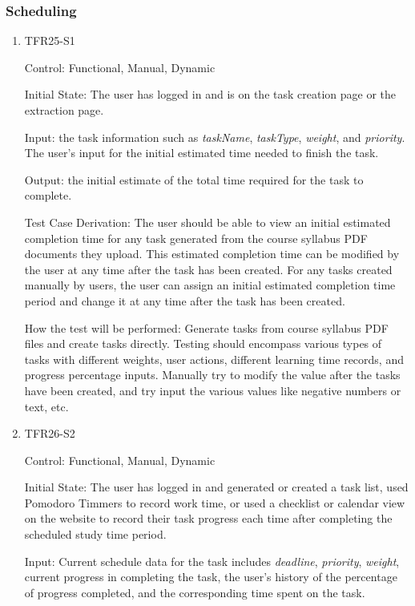\documentclass[12pt, titlepage]{article}
\begin{document}
\subsubsection{Scheduling}
\begin{enumerate}

  \item{TFR25-S1\\}

  Control: Functional, Manual, Dynamic
            
  Initial State: The user has logged in and is on the task creation page or the extraction page.
            
  Input: the task information such as \textit{taskName}, \textit{taskType}, \textit{weight}, and \textit{priority}. The user's input for the initial estimated time needed to finish the task.
            
  Output: the initial estimate of the total time required for the task to complete.
  
  Test Case Derivation: The user should be able to view an initial estimated completion time for any task generated from the course syllabus PDF documents they upload. This estimated completion time can be modified by the user at any time after the task has been created. For any tasks created manually by users, the user can assign an initial estimated completion time period and change it at any time after the task has been created. 
            
  How the test will be performed:
  Generate tasks from course syllabus PDF files and create tasks directly. Testing should encompass various types of tasks with different weights, user actions, different learning time records, and progress percentage inputs. Manually try to modify the value after the tasks have been created, and try input the various values like negative numbers or text, etc.

\item{TFR26-S2\\}

Control: Functional, Manual, Dynamic
					
Initial State: The user has logged in and generated or created a task list, used Pomodoro Timmers to record work time, or used a checklist or calendar view on the website to record their task progress each time after completing the scheduled study time period.
					
Input: Current schedule data for the task includes \textit{deadline}, \textit{priority}, \textit{weight}, current progress in completing the task, the user's history of the percentage of progress completed, and the corresponding time spent on the task.
					

\end{enumerate}
\end{document}

